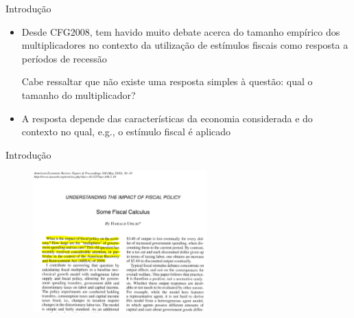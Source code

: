 \documentclass[10pt]{beamer}
\begin{document}
\begin{frame}
    {Introdução}
    \begin{itemize}
        \item Desde CFG2008, tem havido muito debate acerca do tamanho empírico dos multiplicadores no contexto da utilização de estímulos fiscais como resposta a períodos de recessão\bigskip
        
         Cabe ressaltar que não existe uma resposta simples à questão: qual o tamanho do multiplicador?\bigskip
        
        \item A resposta depende das características da economia considerada e do contexto no qual, e.g., o estímulo fiscal é aplicado
    \end{itemize}
\end{frame}

\begin{frame}
    {Introdução}
    \begin{figure}
        \centering
        \href{https://www.aeaweb.org/articles?id=10.1257/aer.100.2.30}{\includegraphics[width=0.6\textwidth]{./figures/aula9_fig4.PNG}}
    \end{figure}
\end{frame}
\end{document}
